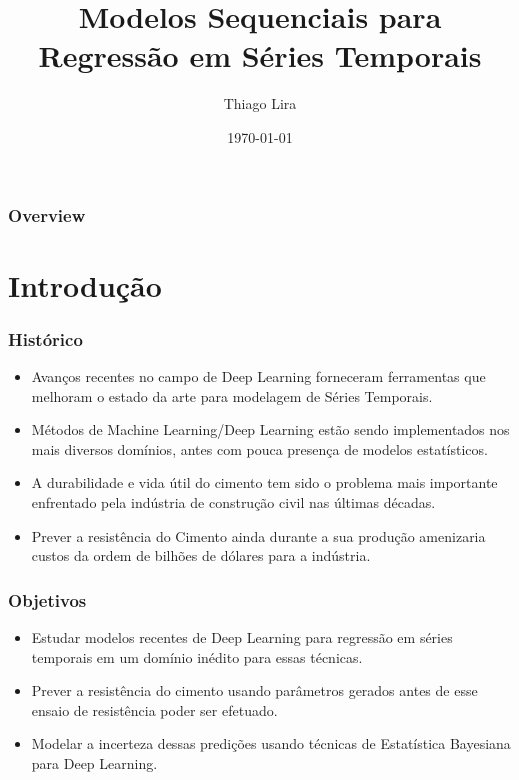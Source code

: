\documentclass{beamer}
\title{Modelos Sequenciais para Regressão em Séries Temporais} %
\author{Thiago Lira} %
\institute[IME-USP] %
{
Instituto de Matemática e Estatística - USP \\ %
\medskip
\textit{thlira@ime.usp.br} %
}
\date{\today} %
\begin{document}
\begin{frame}
\titlepage %
\end{frame}

\begin{frame}
\frametitle{Overview} %
\tableofcontents %
\end{frame}


\section{Introdução}


\begin{frame}
\frametitle{Histórico}

\begin{itemize}
\item Avanços recentes no campo de Deep Learning forneceram ferramentas que
  melhoram o estado da arte para modelagem de Séries Temporais.
  \item Métodos de Machine Learning/Deep Learning estão sendo implementados nos
    mais diversos domínios, antes com pouca presença de modelos estatísticos.
\item A durabilidade e vida útil do cimento tem sido o problema mais importante enfrentado
pela indústria de construção civil nas últimas décadas.
\item Prever a resistência do Cimento ainda durante a sua produção amenizaria
  custos da ordem de bilhões de dólares para a indústria.
\end{itemize}

\end{frame}


\begin{frame}
\frametitle{Objetivos}

\begin{itemize}
\item Estudar modelos recentes de Deep Learning para regressão em séries
  temporais em um domínio inédito para essas técnicas. 
\item Prever a resistência do cimento usando parâmetros gerados antes de esse
  ensaio de resistência poder ser efetuado.
  \item Modelar a incerteza dessas predições usando técnicas de Estatística
    Bayesiana para Deep Learning.
\end{itemize}

\end{frame}
\end{document}
